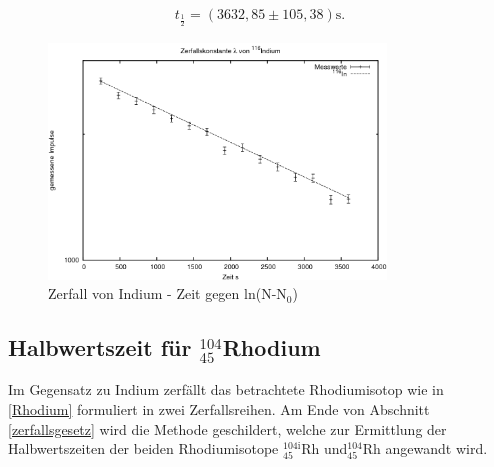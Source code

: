 \begin{align}
 t_{\frac12} = (3632,85 \pm 105,38) \text{s}.
 \label{in}
\end{align}

\begin{figure}[h]
	\includegraphics[width=0.8\textwidth]{pics/indium.png}
	\caption{Zerfall von Indium - Zeit gegen ln(N-N$_0$)}
\end{figure}

\subsection{Halbwertszeit für $^{104}_{45}$Rhodium}
Im Gegensatz zu Indium zerfällt das betrachtete Rhodiumisotop wie in \eqref{Rhodium} formuliert in zwei Zerfallsreihen.
Am Ende von Abschnitt \ref{zerfallsgesetz} wird die Methode geschildert, welche zur Ermittlung der Halbwertszeiten der beiden
Rhodiumisotope $^{104\text{i}}_{45}$Rh und$^{104}_{45}$Rh angewandt wird.

